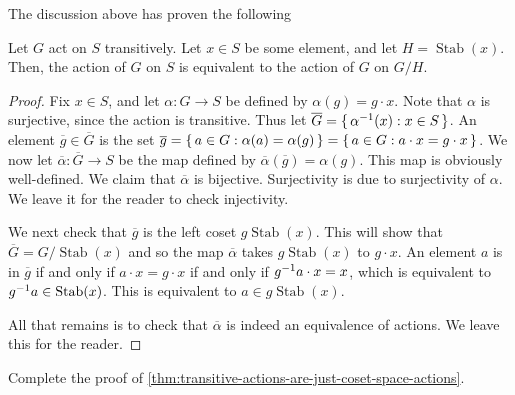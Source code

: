 \documentclass[./main.tex]{subfiles}
\begin{document}
The discussion above has proven the following
\begin{theorem}
\label{thm:transitive-actions-are-just-coset-space-actions}
    Let $G$ act on $S$ transitively. Let $x \in S$ be some element, and let $H =
    \operatorname{Stab}(x)$. Then, the action of $G$ on $S$ is equivalent to the
    action of $G$ on $G/H$.
\end{theorem}
\begin{proof}
    Fix $x \in S$, and let $\alpha: G \to S$ be defined by $\alpha(g) = g \cdot
    x$. Note that $\alpha$ is surjective, since the action is transitive. Thus
    let $\overline G = \set{\alpha^{-1}(x): x \in S}$. An element $\overline g
    \in \overline G$ is the set $\overline g = \set{a \in G: \alpha(a) =
    \alpha(g)} = \set{a \in G: a \cdot x = g \cdot x}$. We now let $\overline
    \alpha: \overline G \to S$ be the map defined by $\overline \alpha
    (\overline g) = \alpha(g)$. This map is obviously well-defined. We claim
    that $\overline \alpha$ is bijective. Surjectivity is due to surjectivity of
    $\alpha$. We leave it for the reader to check injectivity.

    We next check that $\overline g$ is the left coset $g
    \operatorname{Stab}(x)$. This will show that $\overline G =
    G/\operatorname{Stab}(x)$ and so the map $\overline \alpha$ takes
    $g\operatorname{Stab}(x)$ to $g \cdot x$. An element $a$ is in $\overline g$
    if and only if $a \cdot x = g \cdot x$ if and only if $g^{-1} a \cdot x = x$,
    which is equivalent to $g^{-1} a \in \operatorname{Stab}(x)$. This is
    equivalent to $a \in g \operatorname{Stab}(x)$. 

    All that remains is to check that $\overline \alpha$ is indeed an
    equivalence of actions. We leave this for the reader.
\end{proof}

\begin{exercise}
    Complete the proof of
    \cref{thm:transitive-actions-are-just-coset-space-actions}.
\end{exercise}
\end{document}
